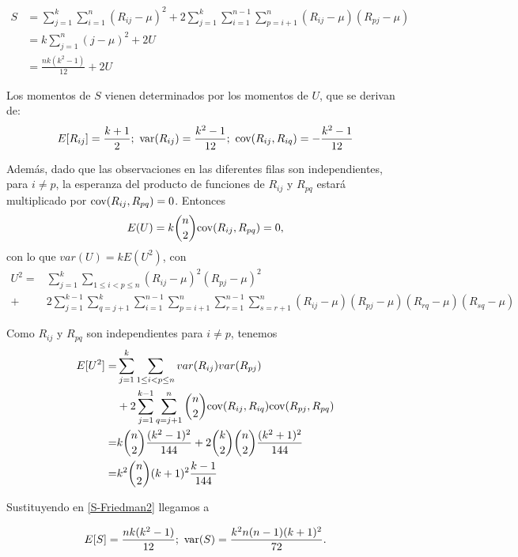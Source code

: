 	\begin{align}
		S 	&= 	\sum\limits_{j=1}^k
					\sum\limits_{i=1}^n (R_{ij}-\mu)^2
				+ 2 \sum\limits_{j=1}^k
					\sum\limits_{i=1}^{n-1}
						\sum\limits_{p=i+1}^n
							(R_{ij}-\mu)(R_{pj}-\mu) 
				\nonumber \\
			&=	k \sum\limits_{j=1}^n (j-\mu)^2 + 2U 
				\nonumber \\
			&=  \frac{nk(k^2-1)}{12} + 2U	
	\label{S-Friedman2}
	\end{align}
	
	Los momentos de $S$ vienen determinados por los momentos 
de $U$, que se derivan de:
	\[ 	E[ R_{ij} ]= \frac{k+1}{2};\ 
		\var(R_{ij})=\frac{k^2-1}{12};\
		\cov(R_{ij},R_{iq}) = -\frac{k^2-1}{12}
	\]
	
	Además, dado que las observaciones en las diferentes 
filas son independientes, para $i \neq p$, la esperanza del 
producto de funciones de $R_{ij}$ y $R_{pq}$ estará 
multiplicado por $\text{cov}(R_{ij},R_{pq})=0$. Entonces
	\[ E(U) = k {n \choose 2} \text{cov}(R_{ij},R_{pq})=0, \] 
	con lo que $var(U) = kE(U^2)$, con
	\begin{align*}
		U^2 =& \sum\limits_{j=1}^k
				\sum\limits_{1 \leq i < p \leq n}
					(R_{ij} - \mu)^2 (R_{pj} - \mu)^2 \\
			+& 2 
			    \sum\limits_{j=1}^{k-1}
			      \sum\limits_{q=j+1}^k
					\sum\limits_{i=1}^{n-1}
					  \sum\limits_{p=i+1}^n	
					  	\sum\limits_{r=1}^{n-1}
						  \sum\limits_{s=r+1}^n
				(R_{ij} - \mu)(R_{pj} - \mu)
				(R_{rq} - \mu)(R_{sq} - \mu)	
	\end{align*}
	
	Como $R_{ij}$ y $R_{pq}$ son independientes para $i \neq p$, tenemos
	\begin{align*}
		E[U^2] =& \sum\limits_{j=1}^k
					\sum\limits_{1 \leq i < p \leq n}
						var(R_{ij})var(R_{pj}) \\
			 &+ 2 
			    \sum\limits_{j=1}^{k-1}
			      \sum\limits_{q=j+1}^n
			    {n \choose 2}
				\text{cov}(R_{ij}, R_{iq}) \text{cov}(R_{pj}, R_{pq}) \\
			=& k {n \choose 2} \frac{(k^2-1)^2}{144} +
				2{k \choose 2}{n \choose 2} 
					\frac{(k^2+1)^2}{144} \\
			=& k^2 {n \choose 2} (k+1)^2 \frac{k-1}{144}
	\end{align*}	
	
	Sustituyendo en \ref{S-Friedman2} llegamos a 
	
	\[ E[S] = \frac{nk(k^2-1)}{12}; \ 
		\var(S)= \frac{k^2n(n-1)(k+1)^2}{72} .\]
	
